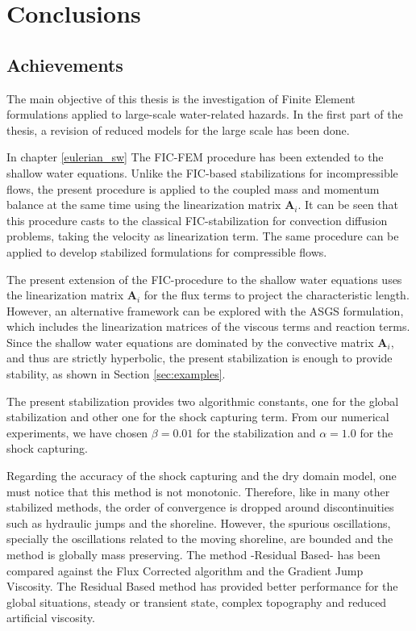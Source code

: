 
\chapter{Conclusions}
\label{conclusions}




\section{Achievements}




The main objective of this thesis is the investigation of Finite Element formulations applied to large-scale water-related hazards. In the first part of the thesis, a revision of reduced models for the large scale has been done.

In chapter \ref{eulerian_sw} The FIC-FEM procedure has been extended to the shallow water equations. Unlike the FIC-based stabilizations for incompressible flows, the present procedure is applied to the coupled mass and momentum balance at the same time using the linearization matrix $\mathbf{A}_i$. It can be seen that this procedure casts to the classical FIC-stabilization for convection diffusion problems, taking the velocity as linearization term. The same procedure can be applied to develop stabilized formulations for compressible flows.

The present extension of the FIC-procedure to the shallow water equations uses the linearization matrix $\mathbf{A}_i$ for the flux terms to project the characteristic length. However, an alternative framework can be explored with the ASGS \cite{hughes1995,codina2008} formulation, which includes the linearization matrices of the viscous terms and reaction terms. Since the shallow water equations are dominated by the convective matrix $\mathbf{A}_i$, and thus are strictly hyperbolic, the present stabilization is enough to provide stability, as shown in Section \ref{sec:examples}.

The present stabilization provides two algorithmic constants, one for the global stabilization and other one for the shock capturing term. From our numerical experiments, we have chosen $\beta=0.01$ for the stabilization and $\alpha=1.0$ for the shock capturing.

Regarding the accuracy of the shock capturing and the dry domain model, one must notice that this method is not monotonic. Therefore, like in many other stabilized methods, the order of convergence is dropped around discontinuities such as hydraulic jumps and the shoreline. However, the spurious oscillations, specially the oscillations related to the moving shoreline, are bounded and the method is globally mass preserving. The method -Residual Based- has been compared against the Flux Corrected algorithm and the Gradient Jump Viscosity. The Residual Based method has provided better performance for the global situations, steady or transient state, complex topography and reduced artificial viscosity.

